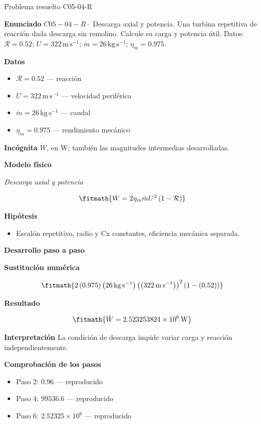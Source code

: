 \documentclass[10pt,openany]{book}
\begin{document}
\begin{studiumworked}{Problema resuelto C05-04-R}


\noindent\textbf{Enunciado}
\(C05-04-R \cdot\) Descarga axial y potencia. Una turbina repetitiva de reacción dada descarga sin remolino. Calcule su carga y potencia útil. Datos: \(\mathcal R=0.52\); \(U=322\, \mathrm{m}\,\mathrm{s}^{-1}\); \(\dot m=26\, \mathrm{kg}\,\mathrm{s}^{-1}\); \(\eta_m=0.975\).

\noindent\textbf{Datos}
\begin{itemize}
\item $\mathcal R = 0.52$ — reacción
\item $U = 322\,\mathrm{m}\,\mathrm{s}^{-1}$ — velocidad periférica
\item $\dot m = 26\,\mathrm{kg}\,\mathrm{s}^{-1}$ — caudal
\item $\eta_m = 0.975$ — rendimiento mecánico
\end{itemize}

\noindent\textbf{Incógnita}
$\dot{W}$, en $\mathrm{W}$; también las magnitudes intermedias desarrolladas.

\noindent\textbf{Modelo físico}

\noindent\textit{Descarga axial y potencia}

\[
\fitmath{\dot{W}=2 \eta_m \dot m U^{2} \left(1 - \mathcal R\right)}
\]

\noindent\textbf{Hipótesis}
\begin{itemize}
\item Escalón repetitivo, radio y Cx constantes, eficiencia mecánica separada.
\end{itemize}

\noindent\textbf{Desarrollo paso a paso}



\noindent\textbf{Sustitución numérica}

\[
\fitmath{2 \left(0.975\right) \left(26\,\mathrm{kg}\,\mathrm{s}^{-1}\right) \left(\left(322\,\mathrm{m}\,\mathrm{s}^{-1}\right)\right)^{2} \left(1 - \left(0.52\right)\right)}
\]

\noindent\textbf{Resultado}

\[
\fitmath{\dot{W}=2.523253824\times10^{6}\,\mathrm{W}}
\]

\noindent\textbf{Interpretación}
La condición de descarga impide variar carga y reacción independientemente.

\noindent\textbf{Comprobación de los pasos}
\begin{itemize}
\item Paso 2: $0.96$ — reproducido
\item Paso 4: $99536.6$ — reproducido
\item Paso 6: $2.52325\times 10^{6}$ — reproducido
\end{itemize}


\end{studiumworked}
\end{document}
